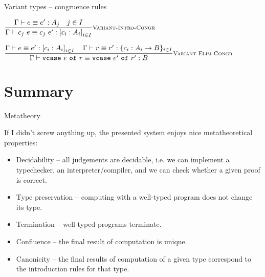 \documentclass{beamer}
\begin{document}
\begin{frame}{Variant types -- congruence rules}

\begin{center}
  $\infrule[Variant-Intro-Congr]{\compeq{e}{e'}{A_j} \quad \sidecond{j \in I}}{\compeq{\app{c_j}{e}}{\app{c_j}{e'}}{\varianttypes{c}{A}{i}{I}}}$

  \vspace{2em}

  $\infrule[Variant-Elim-Congr]{\compeq{e}{e'}{\varianttypes{c}{A}{i}{I}} \quad \compeq{r}{r'}{\recordtype{c_i : \Fun{A_i}{B}}_{i \in I}}}{\compeq{\vcase{e}{r}}{\vcase{e'}{r'}}{B}}$
\end{center}

\end{frame}

\section{Summary}

\begin{frame}{Metatheory}

If I didn't screw anything up, the presented system enjoys nice metatheoretical properties:
\begin{itemize}
  \item Decidability -- all judgements are decidable, i.e. we can implement a typechecker, an interpreter/compiler, and we can check whether a given proof is correct.
  \item Type preservation -- computing with a well-typed program does not change its type.
  \item Termination -- well-typed programs terminate.
  \item Confluence -- the final result of computation is unique.
  \item Canonicity -- the final results of computation of a given type correspond to the introduction rules for that type.
\end{itemize}

\end{frame}
\end{document}
